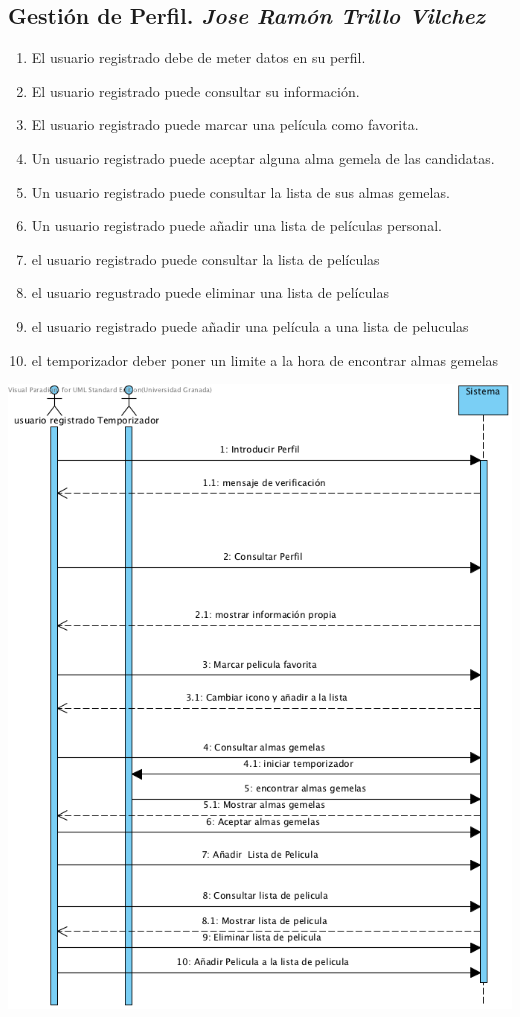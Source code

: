 \documentclass{article}
\begin{document}
	\subsection*{Gestión de Perfil. \textit{Jose Ramón Trillo Vilchez}}
	\begin{enumerate}
		\item El usuario registrado debe de meter datos en su perfil.
    		\item El usuario registrado puede consultar su información.
    		\item El usuario registrado puede marcar una película como favorita.
    		\item Un usuario registrado puede aceptar alguna alma gemela de las candidatas.
    		\item Un usuario registrado puede consultar la lista de sus almas gemelas.
    		\item Un usuario registrado puede añadir una lista de películas personal.
    		\item el usuario registrado puede consultar la lista de películas
    		\item el usuario regustrado puede eliminar una lista de películas
    		\item el usuario registrado puede añadir una película a una lista de peluculas
    		\item el temporizador deber poner un limite a la hora de encontrar almas gemelas
	\end{enumerate}
	\includegraphics[width=1\linewidth]{./S-Perfil}
		
\end{document}
